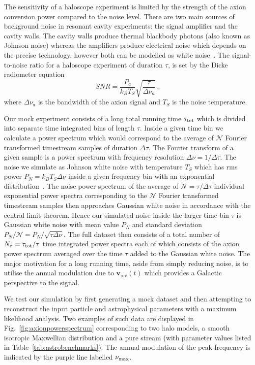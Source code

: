 The sensitivity of a haloscope experiment is limited by the strength of the axion conversion power compared to the noise level. There are two main sources of background noise in resonant cavity experiments: the signal amplifier and the cavity walls. The cavity walls produce thermal blackbody photons (also known as Johnson noise) whereas the amplifiers produce electrical noise which depends on the precise technology, however both can be modelled as white noise~\cite{Daw:1998jm,Hotz:2013xaa,Brubaker:2016ktl}. The signal-to-noise ratio for a haloscope experiment of duration $\tau$, is set by the Dicke radiometer equation~\cite{Dicke:1946aa}
\begin{equation}
 SNR = \frac{P_a}{k_B T_S} \sqrt{\frac{\tau}{\Delta \nu_a}} \, ,
\end{equation}
where $\Delta \nu_a$ is the bandwidth of the axion signal and $T_S$ is the noise temperature.

Our mock experiment consists of a long total running time $\tau_{\rm tot}$ which is divided into separate time integrated bins of length $\tau$. Inside a given time bin we calculate a power spectrum which would correspond to the average of $\mathcal{N}$ Fourier transformed timestream samples of duration $\Delta \tau$. The Fourier transform of a given sample is a power spectrum with frequency resolution $\Delta \nu = 1/\Delta \tau$. The noise we simulate as Johnson white noise with temperature $T_S$ which has rms power $P_N = k_B T_S \Delta \nu$ inside a given frequency bin with an exponential distribution~\cite{Duffy:2006aa}. The noise power spectrum of the average of $\mathcal{N} = \tau/\Delta \tau$ individual exponential power spectra corresponding to the $\mathcal{N}$ Fourier transformed timestream samples then approaches Gaussian white noise in accordance with the central limit theorem. Hence our simulated noise inside the larger time bin $\tau$ is Gaussian white noise with mean value $P_N$ and standard deviation $P_N/\mathcal{N} = P_N/\sqrt{\tau \Delta \nu}$. The full dataset then consists of a total number of $N_\tau = \tau_{\rm tot}/\tau$ time integrated power spectra each of which consists of the axion power spectrum averaged over the time $\tau$ added to the Gaussian white noise. The major motivation for a long running time, aside from simply reducing noise, is to utilise the annual modulation due to $\textbf{v}_\textrm{rev}(t)$ which provides a Galactic perspective to the signal. 

We test our simulation by first generating a mock dataset and then attempting to reconstruct the input particle and astrophysical parameters with a maximum likelihood analysis. Two examples of such data are displayed in Fig.~\ref{fig:axionpowerspectrum} corresponding to two halo models, a smooth isotropic Maxwellian distribution and a pure stream (with parameter values listed in Table~\ref{tab:astrobenchmarks}). The annual modulation of the peak frequency is indicated by the purple line labelled $\nu_{\rm max}$.

